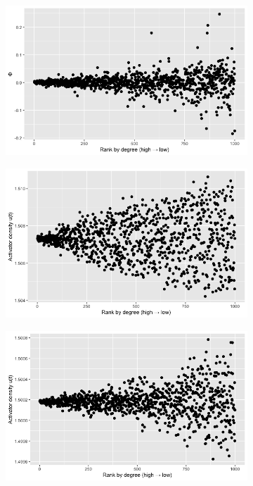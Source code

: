 \begin{figure}[H] %
  \centering
  \begin{subfigure}{0.48\textwidth}
    \centering
    \includegraphics[width=\linewidth]{Graphs/Model2_phi_vs_index.png}
    \caption{}
  \end{subfigure}\hfill
  \begin{subfigure}{0.48\textwidth}
    \centering
    \includegraphics[width=\linewidth]{Graphs/Model2_density_vs_index_t=200.png}
    \caption{}
  \end{subfigure}

  \vspace{0.6em}

  \begin{subfigure}{0.48\textwidth}
    \centering
    \includegraphics[width=\linewidth]{Graphs/Model2_density_vs_index_t=1000.png}
    \caption{}
  \end{subfigure}\hfill
 

\end{figure}
